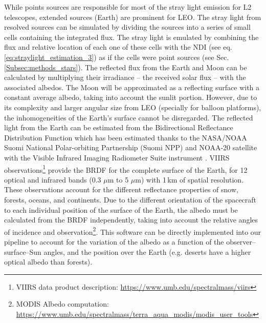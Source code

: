 \documentclass[usenames,dvipsnames,modern]{CLASS_FILES/aastex631}  %
\begin{document}
While points sources are responsible for most of the stray light emission for L2 telescopes, extended sources (Earth) are prominent for LEO. The stray light from resolved sources can be simulated by dividing the sources into a series of small cells containing the integrated flux. The stray light is emulated by combining the flux and relative location of each one of these cells with the NDI (see eq.\,\ref{eq:straylight_estimation_3}) as if the cells were point sources (see Sec.\,\ref{Subsec:methods_stars}). The reflected flux from the Earth and  Moon can be calculated by multiplying their irradiance -- the received solar flux -- with the associated albedos. The Moon will be approximated as a reflecting surface with a constant average albedo, taking into account the sunlit portion. However, due to its complexity and larger angular size from LEO (specially for balloon platforms), the inhomogeneities of the Earth's surface cannot be disregarded. The reflected light from the Earth can be estimated from the Bidirectional Reflectance Distribution Function \citep[BRDF,][]{nicodemus+1977misc, schaepmanstrub+2006RSE103_27} which has been estimated thanks to the NASA/NOAA Suomi National Polar-orbiting Partnership (Suomi NPP) and NOAA-20 satellite with the Visible Infrared Imaging Radiometer Suite instrument \citep[VIIRS,][]{liu+2017RSE201_256}. VIIRS observations\footnote{VIIRS data product description: \url{https://www.umb.edu/spectralmass/viirs}} provide the BRDF for the complete surface of the Earth, for 12 optical and infrared bands (0.3 $\mu$m to 5 $\mu$m) with 1\,km of spatial resolution. These observations account for the different reflectance properties of snow, forests, oceans, and continents. Due to the different orientation of the spacecraft to each individual position of the surface of the Earth, the albedo must be calculated from the BRDF independently, taking into account the relative angles of incidence and observation\footnote{MODIS Albedo computation: \url{https://www.umb.edu/spectralmass/terra_aqua_modis/modis_user_tools}}. This software can be directly implemented into our pipeline to account for the variation of the albedo as a function of the observer--surface--Sun angles, and the position over the Earth (e.g. deserts have a higher optical albedo than forests).\\ 
\end{document}
